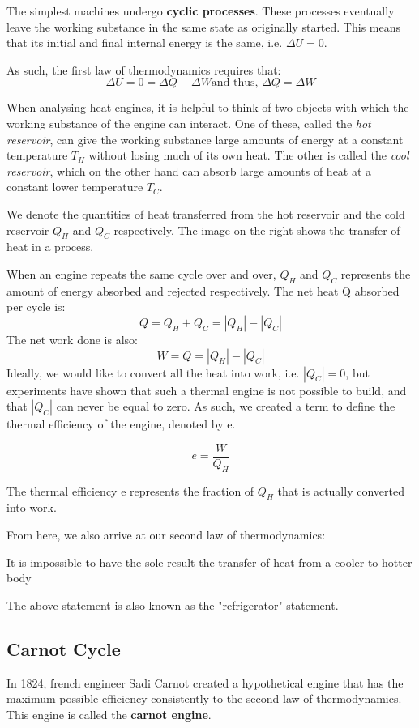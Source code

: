 The simplest machines undergo \textbf{cyclic processes}. These processes eventually leave the working substance in the same state as originally started. This means that its initial and final internal energy is the same, i.e. $\Delta U=0$.

As such, the first law of thermodynamics requires that:
$$\Delta U=0=\Delta Q - \Delta W \text{and thus, } \Delta Q=\Delta W$$

When analysing heat engines, it is helpful to think of two objects with which the working substance of the engine can interact. One of these, called the \textit{hot reservoir}, can give the working substance large amounts of energy at a constant temperature $T_H$ without losing much of its own heat. The other is called the \textit{cool reservoir}, which on the other hand can absorb large amounts of heat at a constant lower temperature $T_C$. 

We denote the quantities of heat transferred from the hot reservoir and the cold reservoir $Q_H$ and $Q_C$ respectively. The image on the right shows the transfer of heat in a process.

When an engine repeats the same cycle over and over, $Q_H$ and $Q_C$ represents the amount of energy absorbed and rejected respectively. The net heat Q absorbed per cycle is:
$$Q=Q_H + Q_C=|Q_H|-|Q_C|$$
The net work done is also:
$$W=Q=|Q_H|-|Q_C|$$
Ideally, we would like to convert all the heat into work, i.e. $|Q_C| = 0$, but experiments have shown that such a thermal engine is not possible to build, and that $|Q_C|$ can never be equal to zero. As such, we created a term to define the thermal efficiency of the engine, denoted by e.
\begin{defi}
$$e=\frac{W}{Q_H}$$
\end{defi}

The thermal efficiency e represents the fraction of $Q_H$ that is actually converted into work.

From here, we also arrive at our second law of thermodynamics:
\begin{form}
It is impossible to have the sole result the transfer of heat from a cooler to hotter body
\end{form}

The above statement is also known as the "refrigerator" statement.

\subsection{Carnot Cycle}
In 1824, french engineer Sadi Carnot created a hypothetical engine that has the maximum possible efficiency consistently to the second law of thermodynamics. This engine is called the \textbf{carnot engine}.

